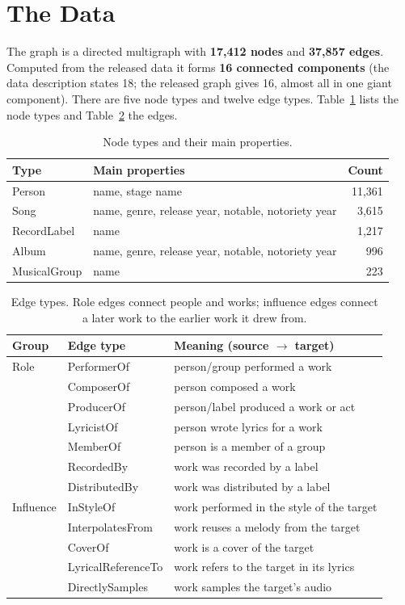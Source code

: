 \documentclass[11pt]{article}
\begin{document}
\section{The Data}
The graph is a directed multigraph with \textbf{17{,}412 nodes} and \textbf{37{,}857
edges}. Computed from the released data it forms \textbf{16 connected components} (the data
description states 18; the released graph gives 16, almost all in one giant component). There
are five node types and twelve edge types. Table~\ref{tab:nodes} lists the node types and
Table~\ref{tab:edges} the edges.

\begin{table}[ht]\centering
\caption{Node types and their main properties.}\label{tab:nodes}
\begin{tabular}{llr}
\toprule
Type & Main properties & Count \\
\midrule
Person & name, stage name & 11{,}361 \\
Song & name, genre, release year, notable, notoriety year & 3{,}615 \\
RecordLabel & name & 1{,}217 \\
Album & name, genre, release year, notable, notoriety year & 996 \\
MusicalGroup & name & 223 \\
\bottomrule
\end{tabular}
\end{table}

\begin{table}[ht]\centering
\caption{Edge types. Role edges connect people and works; influence edges connect a later
work to the earlier work it drew from.}\label{tab:edges}
\begin{tabular}{lll}
\toprule
Group & Edge type & Meaning (source $\rightarrow$ target) \\
\midrule
Role & PerformerOf & person/group performed a work \\
     & ComposerOf & person composed a work \\
     & ProducerOf & person/label produced a work or act \\
     & LyricistOf & person wrote lyrics for a work \\
     & MemberOf & person is a member of a group \\
     & RecordedBy & work was recorded by a label \\
     & DistributedBy & work was distributed by a label \\
\midrule
Influence & InStyleOf & work performed in the style of the target \\
          & InterpolatesFrom & work reuses a melody from the target \\
          & CoverOf & work is a cover of the target \\
          & LyricalReferenceTo & work refers to the target in its lyrics \\
          & DirectlySamples & work samples the target's audio \\
\bottomrule
\end{tabular}
\end{table}
\end{document}
